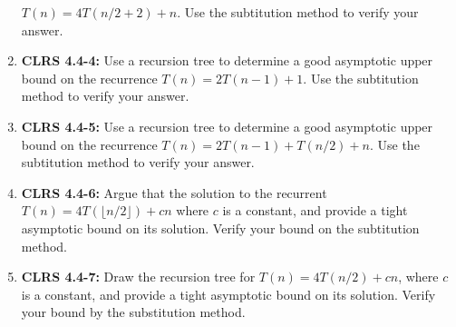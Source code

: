 \documentclass[12pt]{article}
\begin{document}
\begin{enumerate}[1.]
    $T(n) = 4T(n/2 +2) + n$. Use the subtitution method to verify your answer.
    \item \textbf{CLRS 4.4-4:}  Use a recursion tree to determine a good asymptotic upper bound on the recurrence
    $T(n) = 2T(n - 1) + 1$. Use the subtitution method to verify your answer.
    \item \textbf{CLRS 4.4-5:}  Use a recursion tree to determine a good asymptotic upper bound on the recurrence
    $T(n) = 2T(n - 1) + T(n/2) + n$. Use the subtitution method to verify your answer.
    \item \textbf{CLRS 4.4-6:}  Argue that the solution to the recurrent $T(n) = 4 T(\lfloor n/2 \rfloor) + cn$ where
    $c$ is a constant, and provide a tight asymptotic bound on its solution. Verify your bound
    on the subtitution method.
    \item \textbf{CLRS 4.4-7:}  Draw the recursion tree for $T(n) = 4T(n/2) + cn$, where $c$ is a constant, and
    provide a tight asymptotic bound on its solution. Verify your bound by the substitution method.
\end{enumerate}
\end{document}
